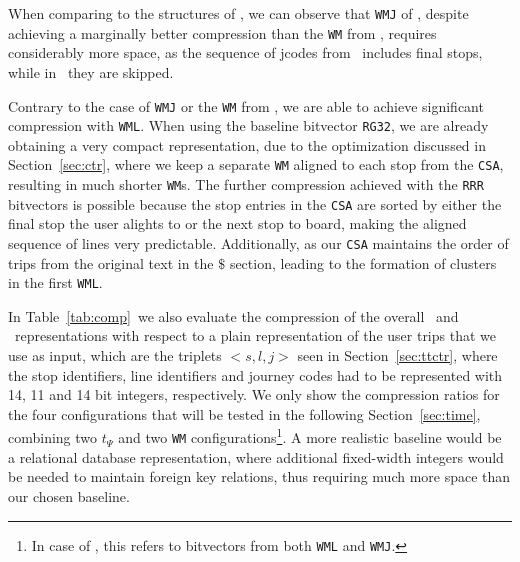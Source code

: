     When comparing to the structures of \ttctr, we can observe that \texttt{WMJ} of \ctr, despite achieving a marginally better compression than the \texttt{WM} from \ttctr, requires considerably more space, as the sequence of jcodes from \ctr~includes final stops, while in \ttctr~they are skipped.
    
    Contrary to the case of \texttt{WMJ} or the \texttt{WM} from \ttctr, we are able to achieve significant compression with \texttt{WML}. When using the baseline bitvector \texttt{RG32}, we are already obtaining a very compact representation, due to the optimization discussed in Section~\ref{sec:ctr}, where we keep a separate \texttt{WM} aligned to each stop from the \texttt{CSA}, resulting in much shorter \texttt{WM}s. The further compression achieved with the \texttt{RRR} bitvectors is possible because the stop entries in the \texttt{CSA} are sorted by either the final stop the user alights to or the next stop to board, making the aligned sequence of lines very predictable. Additionally, as our \texttt{CSA} maintains the order of trips from the original text in the $\$$ section, leading to the formation of clusters in the first \texttt{WML}.
    
    In Table~\ref{tab:comp}~we also evaluate the compression of the overall \ttctr~and \ctr~representations with respect to a plain representation of the user trips that we use as input, which are the triplets $<s,l,j>$ seen in Section~\ref{sec:ttctr}, where the stop identifiers, line identifiers and journey codes had to be represented with 14, 11 and 14 bit integers, respectively. We only show the compression ratios for the four configurations that will be tested in the following Section~\ref{sec:time}, combining two $t_{\Psi}$ and two \texttt{WM} configurations\footnote{In case of \ctr, this refers to bitvectors from both \texttt{WML} and \texttt{WMJ}.}. A more realistic baseline would be a relational database representation, where additional fixed-width integers would be needed to maintain foreign key relations, thus requiring much more space than our chosen baseline.
    
